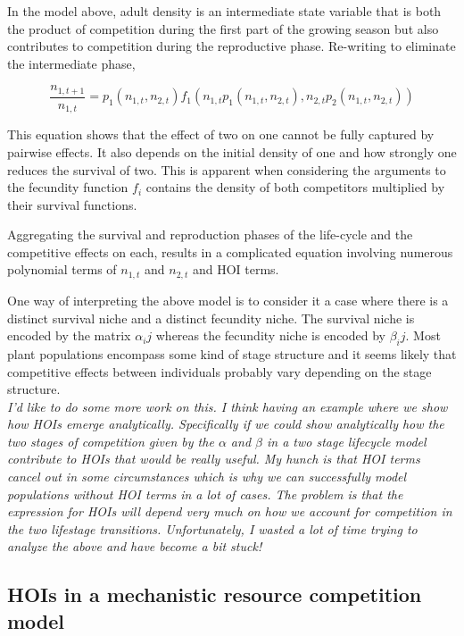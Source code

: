 \documentclass[12pt,]{article}
\begin{document}
In the model above, adult density is an intermediate state variable that
is both the product of competition during the first part of the growing
season but also contributes to competition during the reproductive
phase. Re-writing to eliminate the intermediate phase,

\vspace{-1em}

\begin{equation} \label{eq3}
\frac{n_{1,t+1}}{n_{1,t}} = p_1( n_{1,t}, n_{2,t} )f_1( n_{1,t}p_1( n_{1,t}, n_{2,t} ), n_{2,t}p_2( n_{1,t}, n_{2,t} ) ) 
\end{equation}

This equation shows that the effect of two on one cannot be fully
captured by pairwise effects. It also depends on the initial density of
one and how strongly one reduces the survival of two. This is apparent
when considering the arguments to the fecundity function \(f_i\)
contains the density of both competitors multiplied by their survival
functions.

Aggregating the survival and reproduction phases of the life-cycle and
the competitive effects on each, results in a complicated equation
involving numerous polynomial terms of \(n_{1,t}\) and \(n_{2,t}\) and
HOI terms.

One way of interpreting the above model is to consider it a case where
there is a distinct survival niche and a distinct fecundity niche. The
survival niche is encoded by the matrix \(\alpha_ij\) whereas the
fecundity niche is encoded by \(\beta_ij\). Most plant populations
encompass some kind of stage structure and it seems likely that
competitive effects between individuals probably vary depending on the
stage structure.\\
\emph{I'd like to do some more work on this. I think having an example
where we show how HOIs emerge analytically. Specifically if we could
show analytically how the two stages of competition given by the
\(\alpha\) and \(\beta\) in a two stage lifecycle model contribute to
HOIs that would be really useful. My hunch is that HOI terms cancel out
in some circumstances which is why we can successfully model populations
without HOI terms in a lot of cases. The problem is that the expression
for HOIs will depend very much on how we account for competition in the
two lifestage transitions. Unfortunately, I wasted a lot of time trying
to analyze the above and have become a bit stuck!}

\subsection{HOIs in a mechanistic resource competition
model}\label{hois-in-a-mechanistic-resource-competition-model}
\end{document}
